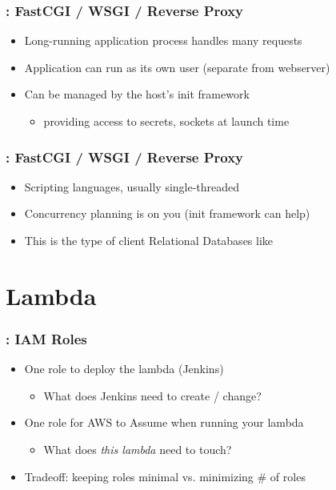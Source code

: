 \documentclass{beamer}
\begin{document}
\begin{frame}
	\frametitle{\insertsection : FastCGI / WSGI / Reverse Proxy}
	\begin{itemize}
		\pause \item Long-running application process handles many requests
		\pause \item Application can run as its own user (separate from webserver)
		\pause \item Can be managed by the host's init framework
			\begin{itemize}
				\item providing access to secrets, sockets at launch time
			\end{itemize}
	\end{itemize}
\end{frame}

\begin{frame}
	\frametitle{\insertsection : FastCGI / WSGI / Reverse Proxy}
	\begin{itemize}
		\pause \item Scripting languages, usually single-threaded
		\pause \item Concurrency planning is on you (init framework can help)
		\pause \item This is the type of client Relational Databases like
	\end{itemize}
\end{frame}

\section{Lambda}
\frame{\sectionpage}

\begin{frame}
	\frametitle{\insertsection : IAM Roles}
	\begin{itemize}
		\pause \item One role to deploy the lambda (Jenkins)
			\begin{itemize}
				\item What does Jenkins need to create / change?
			\end{itemize}
		\pause \item One role for \alert{AWS to Assume} when running your lambda
			\begin{itemize}
				\item What does \emph{this lambda} need to touch?
			\end{itemize}
		\pause \item Tradeoff: keeping roles minimal vs. minimizing \# of roles
	\end{itemize}
\end{frame}
\end{document}
